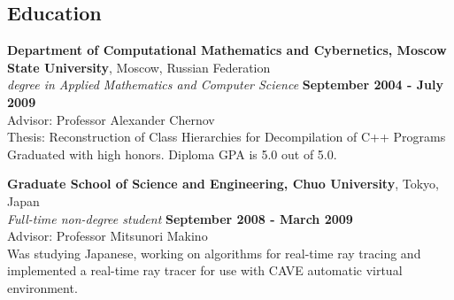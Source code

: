 \documentclass[margin,line]{CV}
\begin{document}
\begin{resume}
    
    \section{\mysidestyle Education}
    \textbf{Department of Computational Mathematics and Cybernetics, Moscow State University}, Moscow, Russian Federation \vspace{2mm}\\\vspace{1mm}%
    \textsl{ degree in Applied Mathematics and Computer Science} \hfill \textbf{September 2004 - July 2009}\vspace{1mm}\\
    Advisor: Professor Alexander Chernov \\
    Thesis: Reconstruction of Class Hierarchies for Decompilation of C++ Programs \\
    Graduated with high honors. Diploma GPA is 5.0 out of 5.0.

    \textbf{Graduate School of Science and Engineering, Chuo University}, Tokyo, Japan \vspace{2mm}\\\vspace{1mm}%
    \textsl{Full-time non-degree student} \hfill \textbf{September 2008 - March 2009}\vspace{1mm}\\
    Advisor: Professor Mitsunori Makino \\
    Was studying Japanese, working on algorithms for real-time ray tracing and implemented a real-time ray tracer for use with CAVE automatic virtual environment.




\end{resume}
\end{document}
